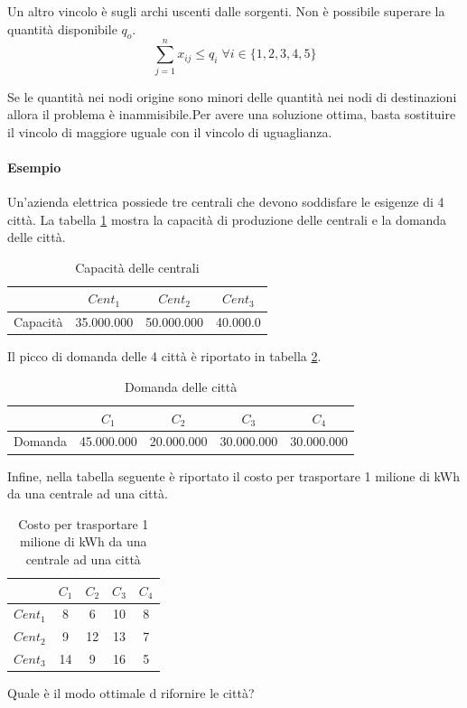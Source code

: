 \documentclass{article}
\begin{document}
Un altro vincolo è sugli archi uscenti dalle sorgenti. Non è possibile superare
la quantità disponibile $q_o$. 
\begin{equation*}
  \sum_{j = 1}^n x_{ij} \leq q_i \; \forall i \in \{1,2,3,4,5\} 
\end{equation*}

Se le quantità nei nodi origine sono minori delle quantità nei nodi di 
destinazioni allora il problema è inammisibile.Per avere una soluzione ottima,
basta sostituire il vincolo di maggiore uguale con il vincolo di uguaglianza.

\paragraph{Esempio}
Un'azienda elettrica possiede tre centrali che devono soddisfare le esigenze di 
4 città. La tabella \ref{tab:capacita} mostra la capacità di produzione delle centrali e 
la domanda delle città.

\begin{table}[h]
  \centering  
  \begin{tabular}{|c|c|c|c|}
    \hline
    & $Cent_1$ & $Cent_2$ & $Cent_3$ \\ 
    \hline 
    Capacità & 35.000.000 & 50.000.000 & 40.000.0 \\
    \hline
  \end{tabular}
  \caption{Capacità delle centrali}
  \label{tab:capacita}
\end{table}

Il picco di domanda delle 4 città è riportato in tabella \ref{tab:domanda}.
\begin{table}[h]
  \centering  
  \begin{tabular}{|c|c|c|c|c|}
    \hline
    & $C_1$ & $C_2$ & $C_3$ & $C_4$ \\ 
    \hline 
    Domanda & 45.000.000 & 20.000.000 & 30.000.000 & 30.000.000 \\
    \hline
  \end{tabular}
  \caption{Domanda delle città}
  \label{tab:domanda}
\end{table}

Infine, nella tabella seguente è riportato il costo per trasportare 1 milione 
di kWh da una centrale ad una città.
\begin{table}[h]
  \centering  
  \begin{tabular}{|c|c|c|c|c|}
    \hline
    & $C_1$ & $C_2$ & $C_3$ & $C_4$ \\ 
    \hline 
    $Cent_1$ & 8 & 6 & 10 & 8 \\
    \hline
    $Cent_2$ & 9 & 12 & 13 & 7 \\
    \hline
    $Cent_3$ & 14 & 9 & 16 & 5 \\
    \hline
  \end{tabular}
  \caption{Costo per trasportare 1 milione di kWh da una centrale ad una città}
  \label{tab:costo}
\end{table}
Quale è il modo ottimale d rifornire le città?\\
\end{document}
